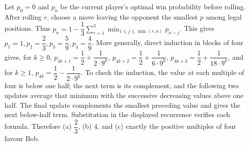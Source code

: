 Let $p_0=0$ and $p_n$ be the current player's optimal win probability before rolling. After rolling $r$, choose a move leaving the opponent the smallest $p$ among legal positions. Thus $p_n=1-\dfrac{1}{3}\sum_{r=1}^3\min_{1\le j\le\min(r,n)}p_{n-j}$. This gives $p_1=1,p_2=\dfrac{2}{3},p_3=\dfrac{5}{9},p_4=\dfrac{4}{9}$. More generally, direct induction in blocks of four gives, for $k\ge0$, $p_{4k+1}=\dfrac{1}{2}+\dfrac{1}{2\cdot9^k}$, $p_{4k+2}=\dfrac{1}{2}+\dfrac{1}{6\cdot9^k}$, $p_{4k+3}=\dfrac{1}{2}+\dfrac{1}{18\cdot9^k}$, and for $k\ge1$, $p_{4k}=\dfrac{1}{2}-\dfrac{1}{2\cdot9^k}$. To check the induction, the value at each multiple of four is below one half; the next term is its complement, and the following two updates average that minimum with the successive decreasing values above one half. The final update complements the smallest preceding value and gives the next below-half term. Substitution in the displayed recurrence verifies each formula. Therefore (a) $\boxed{\dfrac{2}{3}}$, (b) $\boxed4$, and (c) exactly the positive multiples of four favour Bob.
